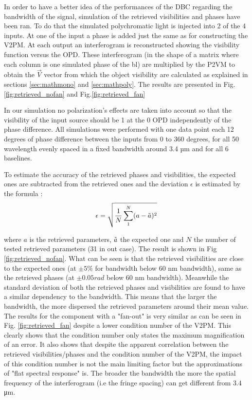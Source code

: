 In order to have a better idea of the performances of the DBC regarding the bandwidth of the signal, simulation of the retrieved visibilities and phases have been ran. To do that the simulated polychromatic light is injected into 2 of the 4 inputs. At one of the input a phase is added just the same as for constructing the V2PM. At each output an interferogram is reconstructed showing the visibility function versus the OPD. These interferogram (in the shape of a matrix where each column is one simulated phase of the \gls{bl}) are multiplied by the P2VM to obtain the $\vec{V}$ vector from which the object visibility are calculated as explained in sections \ref{sec:mathmono} and \ref{sec:mathpoly}. The results are presented in Fig.\ref{fig:retrieved_nofan} and Fig.\ref{fig:retrieved_fan}

In our simulation no polarization's effects are taken into account so that the visibility of the input source should be 1 at the 0 OPD independently of the phase difference. All simulations were performed with one data point each 12 degrees of phase difference between the inputs from 0 to 360 degrees, for all 50 wavelength evenly spaced in a fixed bandwidth around 3.4 µm and for all 6 baselines. 

To estimate the accuracy of the retrieved phases and visibilities, the expected ones are subtracted from the retrieved ones and the deviation $\epsilon$ is estimated by the formula :
\begin{equation}\label{eq:deviation}
\epsilon = \sqrt{\frac{1}{N}\sum_{1}^{N}(a-\Tilde{a})^2}
\end{equation}

where $a$ is the retrieved parameters, $\Tilde{a}$ the expected one and $N$ the number of tested retrieved parameters (31 in out case).
The result is shown in Fig \ref{fig:retrieved_nofan}. What can be seen is that the retrieved visibilities are close to the expected ones (at $\pm5\%$ for bandwidth below 60 nm bandwidth), same as the retrieved phases (at $\pm 0.05 rad$ below 60 nm bandwidth).
Meanwhile the standard deviation of both the retrieved phases and visibilities are found to have a similar dependency to the bandwidth. This means that the larger the bandwidth, the more dispersed the retrieved parameters around their mean value. 
The results for the component with a "fan-out" is very similar as can be seen in Fig. \ref{fig:retrieved_fan} despite a lower condition number of the V2PM. This clearly shows that the condition number only states the maximum magnification of an error. It also shows that despite the apparent correlation between the retrieved visibilities/phases and the condition number of the V2PM, the impact of this condition number is not the main limiting factor but the approximations of "flat spectral response" is. The broader the bandwidth the more the spatial frequency of the interferogram (i.e the fringe spacing) can get different from 3.4 \si{\micro\meter}. 


